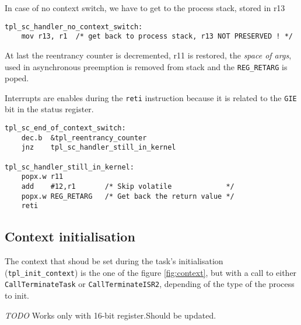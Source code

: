 \documentclass[11pt, oneside]{article}   	%
\begin{document}
In case of no context switch, we have to get to the process stack, stored in r13

\begin{lstlisting}[backgroundcolor=\color{red!15}]
tpl_sc_handler_no_context_switch:
    mov r13, r1	 /* get back to process stack, r13 NOT PRESERVED ! */
\end{lstlisting}
At last the reentrancy counter is decremented, r11 is restored, the \emph{space of args}, used in asynchronous preemption is removed from stack and the \lstinline{REG_RETARG} is poped.

Interrupts are enables during the \texttt{reti} instruction because it is related to the \texttt{GIE} bit in the status register.
\begin{lstlisting}[backgroundcolor=\color{yellow!15}]
tpl_sc_end_of_context_switch:
    dec.b  &tpl_reentrancy_counter
    jnz    tpl_sc_handler_still_in_kernel    

tpl_sc_handler_still_in_kernel:
    popx.w r11
    add    #12,r1       /* Skip volatile             */
    popx.w REG_RETARG   /* Get back the return value */
    reti
\end{lstlisting}

\subsection{Context initialisation}
The context that shoud be set during the task's initialisation (\texttt{tpl\_init\_context}) is the one of the figure \ref{fig:context}, but with a call to either \texttt{CallTerminateTask} or \texttt{CallTerminateISR2}, depending of the type of the process to init.

\emph{TODO} Works only with 16-bit register.Should be updated.
\end{document}
